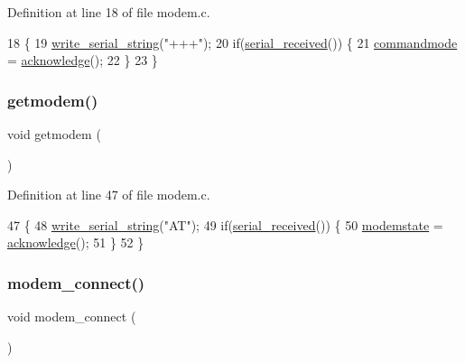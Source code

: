 Definition at line 18 of file modem.\+c.


\begin{DoxyCode}
18                       \{
19     \hyperlink{a00056_aabbe45d6670f606c53ba38a5fb14b650_aabbe45d6670f606c53ba38a5fb14b650}{write\_serial\_string}(\textcolor{stringliteral}{"+++"});
20     \textcolor{keywordflow}{if}(\hyperlink{a00056_af10f0e64ba89e8635aa7245ca08297c5_af10f0e64ba89e8635aa7245ca08297c5}{serial\_received}()) \{
21         \hyperlink{a00044_aaf612f2f6c2c9931ab63296b3514a037_aaf612f2f6c2c9931ab63296b3514a037}{commandmode} = \hyperlink{a00044_a8529dba543149138317e327931bf5a5c_a8529dba543149138317e327931bf5a5c}{acknowledge}();
22     \}
23 \}
\end{DoxyCode}
\mbox{\label{a00044_a5e56e19ccc8f36690d515dd09948db10_a5e56e19ccc8f36690d515dd09948db10}} 
\subsubsection{\texorpdfstring{getmodem()}{getmodem()}}
{\footnotesize\ttfamily void getmodem (\begin{DoxyParamCaption}{ }\end{DoxyParamCaption})}



Definition at line 47 of file modem.\+c.


\begin{DoxyCode}
47                 \{
48     \hyperlink{a00056_aabbe45d6670f606c53ba38a5fb14b650_aabbe45d6670f606c53ba38a5fb14b650}{write\_serial\_string}(\textcolor{stringliteral}{"AT"});
49     \textcolor{keywordflow}{if}(\hyperlink{a00056_af10f0e64ba89e8635aa7245ca08297c5_af10f0e64ba89e8635aa7245ca08297c5}{serial\_received}()) \{
50         \hyperlink{a00044_a0105e5654e7f0fa503f2853c88a2f782_a0105e5654e7f0fa503f2853c88a2f782}{modemstate} = \hyperlink{a00044_a8529dba543149138317e327931bf5a5c_a8529dba543149138317e327931bf5a5c}{acknowledge}();
51     \}
52 \}
\end{DoxyCode}
\mbox{\label{a00044_a283a7e4b715971478687b2d7547780cb_a283a7e4b715971478687b2d7547780cb}} 
\subsubsection{\texorpdfstring{modem\+\_\+connect()}{modem\_connect()}}
{\footnotesize\ttfamily void modem\+\_\+connect (\begin{DoxyParamCaption}{ }\end{DoxyParamCaption})}



